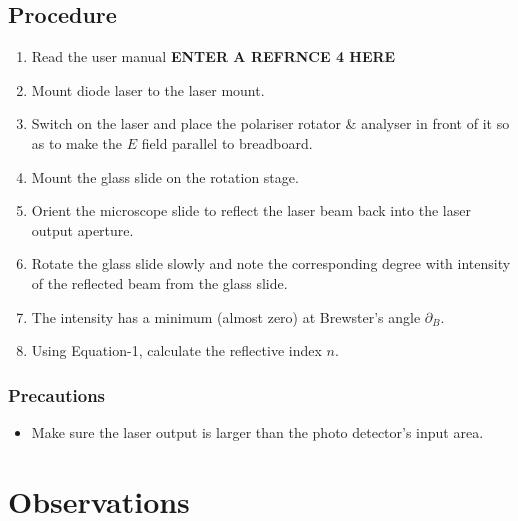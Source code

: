 \documentclass[%
 jor,
 amsmath,amssymb,
 reprint,
]{revtex4-2}
\begin{document}
\subsection{Procedure}
\begin{enumerate}
	\item Read the user manual \textbf{ENTER A REFRNCE 4 HERE}
	\item Mount diode laser to the laser mount.
	\item Switch on the laser and place the polariser rotator & analyser in front of it so as to make the $E$ field parallel to breadboard.
	\item Mount the glass slide on the rotation stage.
	\item Orient the microscope slide to reflect the laser beam back into the laser output aperture.
	\item Rotate the glass slide slowly and note the corresponding degree with intensity of the reflected beam from the glass slide.
	\item The intensity has a  minimum (almost zero) at Brewster's angle $\partial_B$. 
	\item Using Equation-1, calculate the reflective index $n$.
\end{enumerate}
\subsubsection{Precautions}
\begin{itemize}
	\item Make sure the laser output is larger than the photo detector's input area.
\end{itemize}
\section{Observations}
\end{document}
